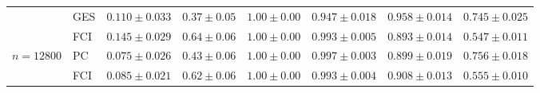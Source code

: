 \begin{tabular}{llcccccc}
 & GES & $0.110\pm0.033$ & $0.37\pm0.05$ & $1.00\pm0.00$ & $0.947\pm0.018$ & $0.958\pm0.014$ & $0.745\pm0.025$ \\
 & FCI & $0.145\pm0.029$ & $0.64\pm0.06$ & $1.00\pm0.00$ & $0.993\pm0.005$ & $0.893\pm0.014$ & $0.547\pm0.011$ \\
$n{=}12800$ & PC & $0.075\pm0.026$ & $0.43\pm0.06$ & $1.00\pm0.00$ & $0.997\pm0.003$ & $0.899\pm0.019$ & $0.756\pm0.018$ \\
 & FCI & $0.085\pm0.021$ & $0.62\pm0.06$ & $1.00\pm0.00$ & $0.993\pm0.004$ & $0.908\pm0.013$ & $0.555\pm0.010$ \\
\bottomrule
\end{tabular}
